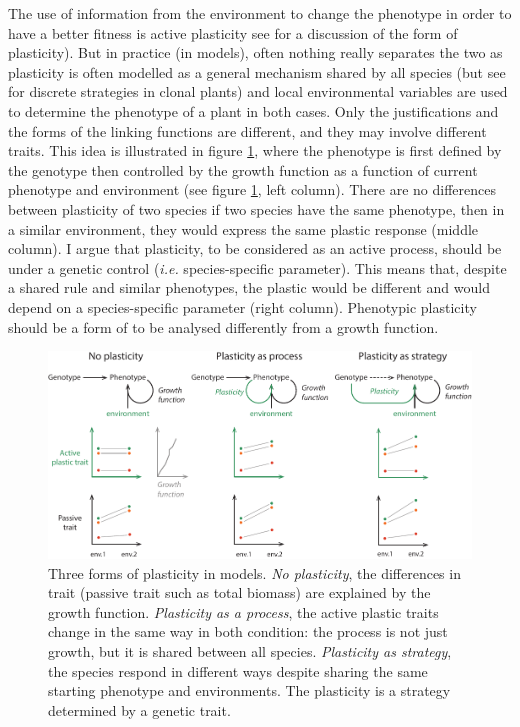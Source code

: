 The use of information from the environment to change the phenotype in order to have a better fitness is active plasticity see \citet{forsman_rethinking_2014} for a discussion of the form of plasticity). But in practice (in models)\parencite{maire_plasticity_2013}, often nothing really separates the two as plasticity is often modelled as a general mechanism shared by all species (but see \citet{jablonka_adaptive_1995} for discrete strategies in clonal plants) and local environmental variables are used to determine the phenotype of a plant in both cases. Only the justifications and the forms of the linking functions are different, and they may involve different traits. This idea is illustrated in figure \ref{fig:plastic_function}, where the phenotype is first defined by the genotype then controlled by the growth function as a function of current phenotype and environment (see figure \ref{fig:plastic_function}, left column). There are no differences between plasticity of two species if two species have the same phenotype, then in a similar environment, they would express the same plastic response (middle column). I argue that plasticity, to be considered as an active process, should be under a genetic control (\textit{i.e.} species-specific parameter). This means that, despite a shared rule and similar phenotypes, the plastic would be different and would depend on a species-specific parameter (right column). Phenotypic plasticity should be a form of  to be analysed differently from a growth function.


\begin{figure}
    \includegraphics[width=1\linewidth]{./1_Introduction/graphics/plastic_function.pdf}
  \caption[Forms of plasticity in models]{Three forms of plasticity in models. \textit{No plasticity}, the differences in trait (passive trait such as total biomass) are explained by the growth function. \textit{Plasticity as a process}, the active plastic traits change in the same way in both condition: the process is not just growth, but it is shared between all species. \textit{Plasticity as strategy}, the species respond in different ways despite sharing the same starting phenotype and environments. The plasticity is a strategy determined by a genetic trait.}
  \label{fig:plastic_function}
\end{figure}

